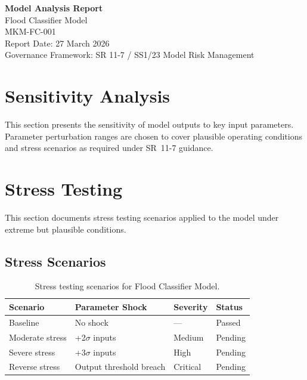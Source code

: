 \documentclass[11pt,a4paper]{article}
\begin{document}
\begin{center}
{\Large\textbf{Model Analysis Report}}\\[6pt]
{\large\textcolor{mkmblue}{Flood Classifier Model}}\\[4pt]
{\normalsize MKM-FC-001}\\[12pt]
{\small Report Date: 27 March 2026}\\[4pt]
{\footnotesize Governance Framework: SR 11-7 / SS1/23 Model Risk Management}
\end{center}

\vspace{8mm}
\tableofcontents
\newpage

\section{Sensitivity Analysis}

This section presents the sensitivity of model outputs to key input parameters.
Parameter perturbation ranges are chosen to cover plausible operating conditions
and stress scenarios as required under SR~11-7 guidance.




\section{Stress Testing}

This section documents stress testing scenarios applied to the model
under extreme but plausible conditions.

\subsection{Stress Scenarios}

\begin{table}[H]
    \centering
    \caption{Stress testing scenarios for Flood Classifier Model.}
    \begin{tabular}{llll}
        \toprule
        \textbf{Scenario} & \textbf{Parameter Shock} & \textbf{Severity} & \textbf{Status} \\
        \midrule
        Baseline & No shock & --- & Passed \\
        Moderate stress & +2$\sigma$ inputs & Medium & Pending \\
        Severe stress & +3$\sigma$ inputs & High & Pending \\
        Reverse stress & Output threshold breach & Critical & Pending \\
        \bottomrule
    \end{tabular}
\end{table}
\end{document}
